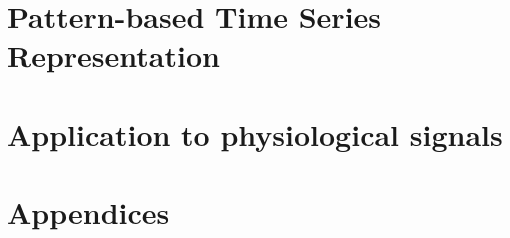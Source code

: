 \documentclass[
	a4paper,
	twoside,	%
	openright,  %
	11pt,
	draft=false,
	oldfontcommands]{memoir}
\def\TikzLocation{../tikz/}
\newcommand\setchap[1]{\setcounter{chapter}{#1}}
\def\crossref{}
\begin{document}
\def\biblio{}
\def\cbiblio{}
\def\crossref{}
\renewcommand\setchap[1]{}
\def\TikzLocation{./tikz/}
\def\CHANGES{}



\blankpage


\setcounter{tocdepth}{1}
\begin{KeepFromToc}
\tableofcontents
\end{KeepFromToc}



\blankpage

\blankpage

\blankpage

\blankpage



\part{Pattern-based Time Series Representation}
\label{part1}


\introPart{}







\part{Application to physiological signals}
\label{part3}

\introPart{}







\appendix
\part*{Appendices}





\def\bibsection{
\chapter*{Bibliography}
\addcontentsline{toc}{part}{Bibliography}
\markboth{Bibliography}{Bibliography}}





\end{document}
